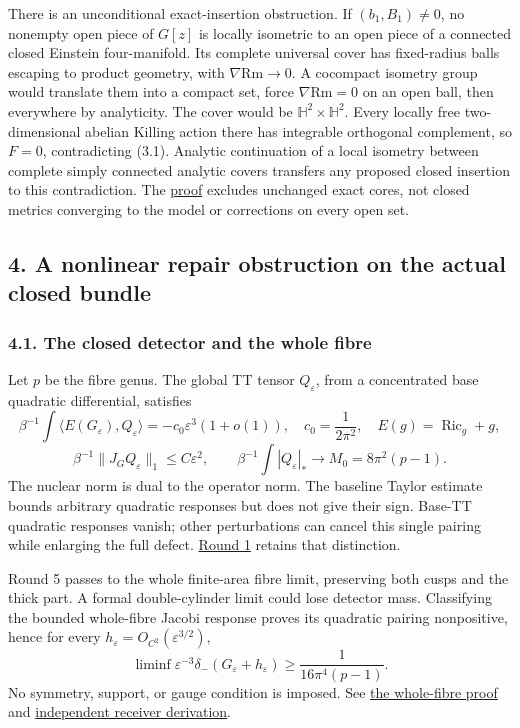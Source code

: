 \documentclass[
  english,
]{article}
\begin{document}
There is an unconditional exact-insertion obstruction. If
\((b_1,B_1)\ne0\), no nonempty open piece of \(G[z]\) is locally
isometric to an open piece of a connected closed Einstein four-manifold.
Its complete universal cover has fixed-radius balls escaping to product
geometry, with \(\nabla\mathrm{Rm}\to0\). A cocompact isometry group
would translate them into a compact set, force \(\nabla\mathrm{Rm}=0\)
on an open ball, then everywhere by analyticity. The cover would be
\(\mathbb H^2\times\mathbb H^2\). Every locally free two-dimensional
abelian Killing action there has integrable orthogonal complement, so
\(F=0\), contradicting (3.1). Analytic continuation of a local isometry
between complete simply connected analytic covers transfers any proposed
closed insertion to this contradiction. The
\href{../proofs/round4_exact_core.md}{proof} excludes unchanged exact
cores, not closed metrics converging to the model or corrections on
every open set.

\hypertarget{a-nonlinear-repair-obstruction-on-the-actual-closed-bundle}{%
\subsection{4. A nonlinear repair obstruction on the actual closed
bundle}\label{a-nonlinear-repair-obstruction-on-the-actual-closed-bundle}}

\hypertarget{the-closed-detector-and-the-whole-fibre}{%
\subsubsection{4.1. The closed detector and the whole
fibre}\label{the-closed-detector-and-the-whole-fibre}}

Let \(p\) be the fibre genus. The global TT tensor \(Q_\varepsilon\),
from a concentrated base quadratic differential, satisfies \[
\beta^{-1}\!\int\langle E(G_\varepsilon),Q_\varepsilon\rangle
=-c_0\varepsilon^3(1+o(1)),\quad c_0=\frac1{2\pi^2},\quad E(g)=\operatorname{Ric}_g+g,
\] \[
\beta^{-1}\|J_GQ_\varepsilon\|_1\le C\varepsilon^2,\qquad
\beta^{-1}\!\int|Q_\varepsilon|_*\longrightarrow M_0=8\pi^2(p-1).
\tag{4.1}
\] The nuclear norm is dual to the operator norm. The baseline Taylor
estimate bounds arbitrary quadratic responses but does not give their
sign. Base-TT quadratic responses vanish; other perturbations can cancel
this single pairing while enlarging the full defect.
\href{../proofs/construction.md}{Round 1} retains that distinction.

Round 5 passes to the whole finite-area fibre limit, preserving both
cusps and the thick part. A formal double-cylinder limit could lose
detector mass. Classifying the bounded whole-fibre Jacobi response
proves its quadratic pairing nonpositive, hence for every
\(h_\varepsilon=O_{C^2}(\varepsilon^{3/2})\), \[
\liminf\varepsilon^{-3}\delta_-(G_\varepsilon+h_\varepsilon)
\ge\frac1{16\pi^4(p-1)}.
\] No symmetry, support, or gauge condition is imposed. See
\href{../proofs/round5_construction.md}{the whole-fibre proof} and
\href{../proofs/round5_receiver_independent.md}{independent receiver
derivation}.
\end{document}
